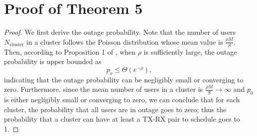 \documentclass[journal,draftclsnofoot,onecolumn,12pt,twoside]{IEEEtran}
\begin{document}
\section{Proof of Theorem 5}
\label{App:ProofThm5}
\begin{proof}

We first derive the outage probability. Note that the number of users $N_{\text{cluster}}$ in a cluster follows the Poisson distribution whose mean value is $\frac{\rho M}{S}$. Then, according to Proposition 1 of \cite{lee2020optimal}, when $\rho$ is sufficiently large, the outage probability is upper bounded as
\begin{equation}
p_o\leq\Theta\left(e^{-\rho}\right),
\end{equation}
indicating that the outage probability can be negligibly small or converging to zero. Furthermore, since the mean number of users in a cluster is $\frac{\rho M}{S}\to \infty$ and $p_0$ is either negligibly small or converging to zero, we can conclude that for each cluster, the probability that all users are in outage goes to zero; thus the probability that a cluster can have at least a TX-RX pair to schedule goes to 1.


\end{proof}
\end{document}
